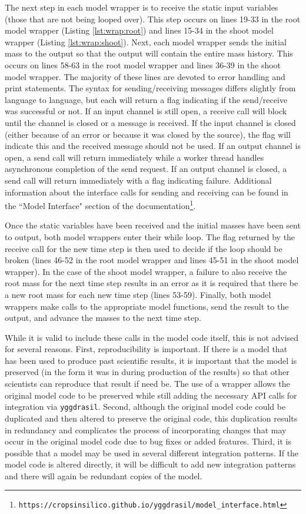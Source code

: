 \documentclass[journal]{IEEEtran}
\newcommand{\pkg}{{\tt yggdrasil}{}}
\newcommand{\pkglink}{yggdrasil}
\begin{document}
The next step in each model wrapper is to receive the static input variables (those that are not being looped over). This step occurs on lines 19-33 in the root model wrapper (Listing \ref{lst:wrap:root}) and lines 15-34 in the shoot model wrapper (Listing \ref{lst:wrap:shoot}). Next, each model wrapper sends the initial mass to the output so that the output will contain the entire mass history. This occurs on lines 58-63 in the root model wrapper and lines 36-39 in the shoot model wrapper. The majority of these lines are devoted to error handling and print statements. The syntax for sending/receiving messages differs slightly from language to language, but each will return a flag indicating if the send/receive was successful or not. If an input channel is still open, a receive call will block until the channel is closed or a message is received. If the input channel is closed (either because of an error or because it was closed by the source), the flag will indicate this and the received message should not be used. If an output channel is open, a send call will return immediately while a worker thread handles asynchronous completion of the send request. If an output channel is closed, a send call will return immediately with a flag indicating failure. Additional information about the interface calls for sending and receiving can be found in the ``Model Interface" section of the documentation\footnote{{\tt https://cropsinsilico.github.io/\pkglink/model\_interface.html}}.

Once the static variables have been received and the initial masses have been sent to output, both model wrappers enter their while loop. The flag returned by the receive call for the new time step is then used to decide if the loop should be broken (lines 46-52 in the root model wrapper and lines 45-51 in the shoot model wrapper). In the case of the shoot model wrapper, a failure to also receive the root mass for the next time step results in an error as it is required that there be a new root mass for each new time step (lines 53-59). Finally, both model wrappers make calls to the appropriate model functions, send the result to the output, and advance the masses to the next time step.

While it is valid to include these calls in the model code itself, this is not advised for several reasons. First, reproducibility is important. If there is a model that has been used to produce past scientific results, it is important that the model is preserved (in the form it was in during production of the results) so that other scientists can reproduce that result if need be. The use of a wrapper allows the original model code to be preserved while still adding the necessary API calls for integration via {\pkg}. Second, although the original model code could be duplicated and then altered to preserve the original code, this duplication results in redundancy and complicates the process of incorporating changes that may occur in the original model code due to bug fixes or added features. Third, it is possible that a model may be used in several different integration patterns. If the model code is altered directly, it will be difficult to add new integration patterns and there will again be redundant copies of the model.
\end{document}
